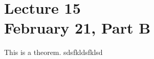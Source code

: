 \chapter*{Lecture 15 \\ February 21, Part B}
\setcounter{chapter}{15}
\setcounter{section}{0}

\begin{thm}
	This is a theorem. sdsfkldsfklsd
\end{thm}
